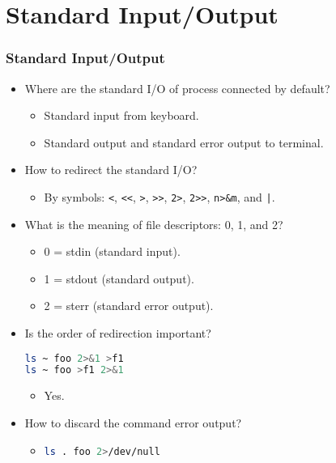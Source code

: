
\section{Standard Input/Output} 
\begin{frame}[fragile]
\frametitle{Standard Input/Output}
	\begin{itemize}

		\item  Where are the standard I/O of process  connected by default?
		\begin{itemize}
			\item Standard input from keyboard.
			\item Standard output and standard error output to terminal.
		\end{itemize}

		\item How to redirect the standard I/O?
		
		\begin{itemize}
			\item By symbols: \texttt{<}, \texttt{<<}, \texttt{>}, \texttt{>>},   \texttt{2>}, \texttt{2>>}, \texttt{n>\&m}, and \texttt{|}.
		\end{itemize}
		\item What is the meaning of file descriptors: 0, 1, and 2?		
		\begin{itemize}
			\item 0 = stdin (standard input).
			\item 1 = stdout (standard output).
			\item 2 = sterr (standard error output).
		\end{itemize}

		\item Is the order of redirection important?
\begin{lstlisting}[language=bash]		
ls ~ foo 2>&1 >f1
ls ~ foo >f1 2>&1
\end{lstlisting}		
		
		\begin{itemize}
			\item Yes.
		\end{itemize}

		\item How to discard the command error output?	
		\begin{itemize}
		
			\item
\begin{lstlisting}[language=bash]		
ls . foo 2>/dev/null
\end{lstlisting}

		\end{itemize}

	\end{itemize}
\end{frame}

